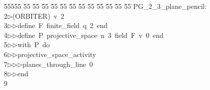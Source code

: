 %
%
\begin{tabbing}
55555 \= 55 \= 55 \= 55 \= 55 \= 55 \= 55 \= 55 \= 55 \= 55 \= 55 \= 55 \= 55 \= \>PG\_2\_3\_plane\_pencil:\\[0pt]
2\>$\triangleright$\>(ORBITER)\ v\ 2\ \\[0pt]
3\>$\triangleright$\>$\triangleright$\>define\ F\ finite\_field\ q\ 2\ end\ \\[0pt]
4\>$\triangleright$\>$\triangleright$\>define\ P\ projective\_space\ n\ 3\ field\ F\ v\ 0\ end\ \\[0pt]
5\>$\triangleright$\>$\triangleright$\>with\ P\ do\ \\[0pt]
6\>$\triangleright$\>$\triangleright$\>projective\_space\_activity\ \\[0pt]
7\>$\triangleright$\>$\triangleright$\>$\triangleright$\>planes\_through\_line\ 0\ \\[0pt]
8\>$\triangleright$\>$\triangleright$\>end\ \\[0pt]
9\>\end{tabbing}

